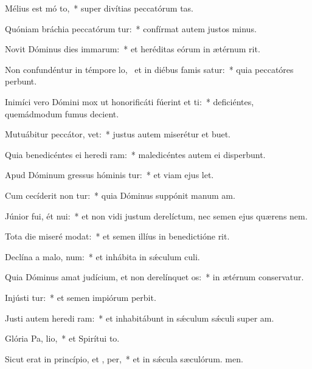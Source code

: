 \item Mélius est mó to,~* super divítias peccatórum tas.
\item Quóniam bráchia peccatórum tur:~* confírmat autem justos minus.
\item Novit Dóminus dies immarum:~* et heréditas eórum in ætérnum rit.
\item Non confundéntur in témpore lo,~\pscross{} et in diébus famis satur:~* quia peccatóres perbunt.
\item Inimíci vero Dómini mox ut honorificáti fúerint et ti:~* deficiéntes, quemádmodum fumus decient.
\item Mutuábitur peccátor,   vet:~* justus autem miserétur et buet.
\item Quia benedicéntes ei heredi ram:~* maledicéntes autem ei disperbunt.
\item Apud Dóminum gressus hóminis tur:~* et viam ejus let.
\item Cum cecíderit non tur:~* quia Dóminus suppónit manum am.
\item Júnior fui, ét nui:~* et non vidi justum derelíctum, nec semen ejus quærens nem.
\item Tota die miseré  modat:~* et semen illíus in benedictióne rit.
\item Declína a malo,   num:~* et inhábita in sǽculum culi.
\item Quia Dóminus amat judícium, et non derelínquet  os:~* in ætérnum conservatur.
\item Injústi tur:~* et semen impiórum perbit.
\item Justi autem heredi ram:~* et inhabitábunt in sǽculum sǽculi super am.
\item Glória Pa,  lio,~* et Spirítui to.
\item Sicut erat in princípio, et ,  per,~* et in sǽcula sæculórum. men.
